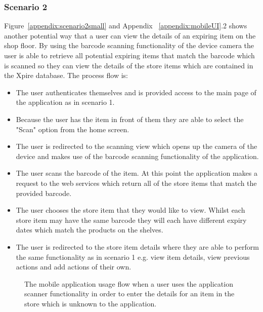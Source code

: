 \documentclass[a4paper,11pt]{report}
\begin{document}
\subsubsection{Scenario 2}
Figure~\ref{appendix:scenario2small} and Appendix ~\ref{appendix:mobileUI}.2 shows another potential way that a user can view the details of an expiring item on the shop floor. By using the barcode scanning functionality of the device camera the user is able to retrieve all potential expiring items that match the barcode which is scanned so they can view the details of the store items which are contained in the Xpire database. The process flow is:
\begin{itemize}
    \item The user authenticates themselves and is provided access to the main page of the application as in scenario 1. 
    \item Because the user has the item in front of them they are able to select the "Scan" option from the home screen.
    \item The user is redirected to the scanning view which opens up the camera of the device and makes use of the barcode scanning functionality of the application.
    \item The user scans the barcode of the item. At this point the application makes a request to the web services which return all of the store items that match the provided barcode. 
    \item The user chooses the store item that they would like to view. Whilst each store item may have the same barcode they will each have different expiry dates which match the products on the shelves. 
    \item The user is redirected to the store item details where they are able to perform the same functionality as in scenario 1 e.g. view item details, view previous actions and add actions of their own.
\end{itemize}

\begin{figure}[H]
    \centering
    \caption{The mobile application usage flow when a user uses the application scanner functionality in order to enter the details for an item in the store which is unknown to the application.}
    \label{appendix:scenario3small}
\end{figure}
\end{document}
